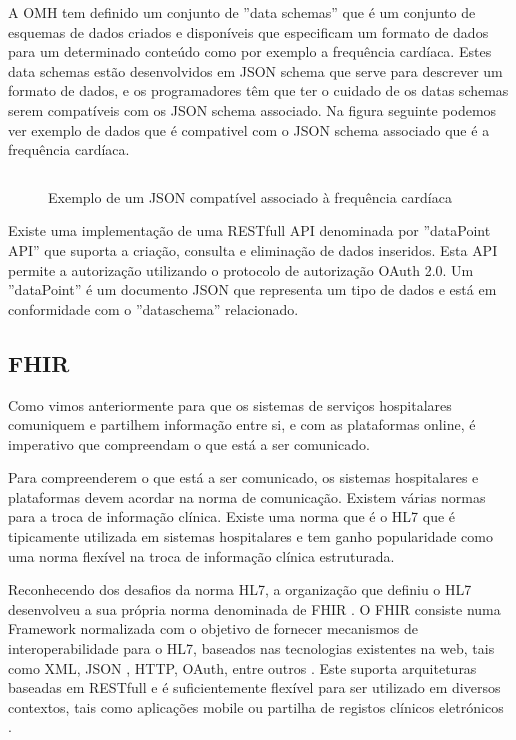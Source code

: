 A \gls{OMH} tem definido um conjunto de ''data schemas'' que é um conjunto de esquemas de dados criados e disponíveis que especificam um formato de dados para um determinado conteúdo como por exemplo a frequência cardíaca\cite{omhschemas}. Estes data schemas estão desenvolvidos em \gls{JSON} schema que serve para descrever um formato de dados, e os programadores têm que ter o cuidado de os datas schemas serem compatíveis com os \gls{JSON} schema associado. Na figura seguinte podemos ver exemplo de dados que é compativel com o \gls{JSON} schema associado que é a frequência cardíaca\cite{omhheartrate}.


\begin{figure}[H]
\inputminted{json}{code/heart-rate.json}
\caption[Exemplo de um \gls{JSON} compatível associado à frequência cardíaca]{Exemplo de um \gls{JSON} compatível associado à frequência cardíaca \cite{omhheartrate}}
\label{f:exemplo}
\end{figure}


Existe uma implementação de uma \gls{REST}full \gls{API} denominada por ''dataPoint API'' que suporta a criação, consulta e eliminação de dados inseridos. Esta \gls{API} permite a autorização utilizando o protocolo de autorização OAuth 2.0. Um ''dataPoint'' é um documento \gls{JSON} que representa um tipo de dados e está em conformidade com o ''dataschema'' relacionado.

\subsection{FHIR}

Como vimos anteriormente para que os sistemas de serviços hospitalares comuniquem e partilhem  informação entre si, e com as plataformas online, é imperativo que compreendam o que está a ser comunicado.
\par 
Para compreenderem o que está a ser comunicado, os sistemas hospitalares e plataformas devem acordar na norma de comunicação. Existem várias normas para a troca de informação clínica. Existe uma norma que é o \gls{HL7} que é tipicamente utilizada em sistemas hospitalares \cite{whyihe} e tem ganho popularidade como uma norma flexível na troca de informação clínica estruturada.


Reconhecendo dos desafios da norma \gls{HL7}, a organização que definiu o \gls{HL7} desenvolveu a sua própria norma denominada de \gls{FHIR} \cite{hl7fhir}. O \gls{FHIR} consiste numa Framework normalizada com o objetivo de fornecer mecanismos de interoperabilidade para o \gls{HL7}, baseados nas tecnologias existentes na web, tais como \gls{XML}, \gls{JSON} , \gls{HTTP}, OAuth, entre outros \cite{hl7fhir}. Este suporta arquiteturas baseadas em \gls{REST}full e é suficientemente flexível para ser utilizado em diversos contextos, tais como aplicações mobile ou partilha de registos clínicos eletrónicos \cite{hl7fhir}.


